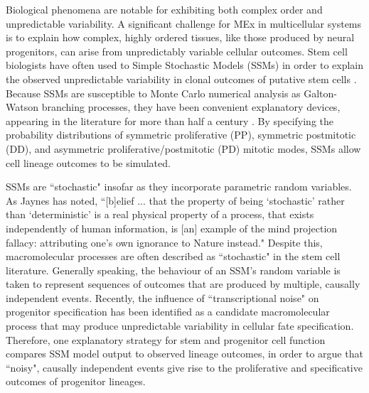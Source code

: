 Biological phenomena are notable for exhibiting both complex order and unpredictable variability. A significant challenge for MEx in multicellular systems is to explain how complex, highly ordered tissues, like those produced by neural progenitors, can arise from unpredictably variable cellular outcomes. Stem cell biologists have often used to Simple Stochastic Models (SSMs) in order to explain the observed unpredictable variability in clonal outcomes of putative stem cells \cite{Fagan2013}. Because SSMs are susceptible to Monte Carlo numerical analysis as Galton-Watson branching processes, they have been convenient explanatory devices, appearing in the literature for more than half a century \cite{Till1964}. By specifying the probability distributions of symmetric proliferative (PP), symmetric postmitotic (DD), and asymmetric proliferative/postmitotic (PD) mitotic modes, SSMs allow cell lineage outcomes to be simulated.

SSMs are ``stochastic" insofar as they incorporate parametric random variables. As Jaynes has noted, ``[b]elief ... that the property of being ‘stochastic' rather than ‘deterministic' is a real physical property of a process, that exists independently of human information, is [an] example of the mind projection fallacy: attributing one’s own ignorance to Nature instead." \cite[pp.506]{Jaynes2003} Despite this, macromolecular processes are often described as ``stochastic" in the stem cell literature. Generally speaking, the behaviour of an SSM's random variable is taken to represent sequences of outcomes that are produced by multiple, causally independent events. Recently, the influence of ``transcriptional noise" on progenitor specification has been identified as a candidate macromolecular process that may produce unpredictable variability in cellular fate specification. Therefore, one explanatory strategy for stem and progenitor cell function compares SSM model output to observed lineage outcomes, in order to argue that ``noisy", causally independent events give rise to the proliferative and specificative outcomes of progenitor lineages.

